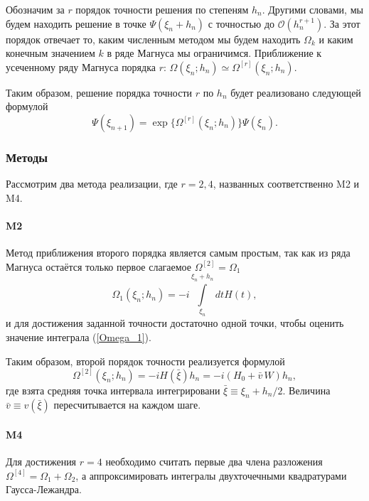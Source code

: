 \documentclass[12pt]{article}
\numberwithin{equation}{section}
\begin{document}
Обозначим за $r$ порядок точности решения по степеням $h_n$. Другими словами, мы будем находить решение в точке $\Psi(\xi_n+h_n)$ с точностью до $\mathcal{O}(h^{r+1}_n)$. За этот порядок отвечает то, каким численным методом мы будем находить $\Omega_k$ и каким конечным значением $k$ в ряде Магнуса мы ограничимся. Приближение к усеченному ряду Магнуса порядка $r$: $\Omega(\xi_n;h_n)\simeq \Omega^{[r]}(\xi_n;h_n)$.

Таким образом, решение порядка точности $r$ по $h_n$ будет реализовано следующей формулой
\begin{equation}
\Psi(\xi_{n+1})=\exp\bigl\{\Omega^{[r]}(\xi_n;h_n)\bigr\}\Psi(\xi_n).
\end{equation}
 
\subsubsection{Методы}

Рассмотрим два метода реализации, где $r=2,4$, названных соответственно M2 и M4.

\paragraph{M2}

Метод приближения второго порядка является самым простым, так как из ряда Магнуса остаётся только первое слагаемое $\Omega^{[2]}=\Omega_1$
\begin{equation}
\label{Omega_1}
\Omega_1(\xi_n;h_n)=-i\!\int\limits_{\xi_n}^{\xi_n+h_n}\! dt H(t),
\end{equation} 
и для достижения заданной точности достаточно одной точки, чтобы оценить значение интеграла (\ref{Omega_1}).

Таким образом, второй порядок точности реализуется формулой
\begin{equation}
\Omega^{[2]}(\xi_n;h_n)=-iH(\bar\xi)h_n=-i(H_0+\bar{v}\,W)h_n,
\end{equation}
где взята средняя точка интервала интегрировани $\bar\xi\equiv\xi_n+h_n/2$. Величина $\bar{v}\equiv v(\bar\xi)$ пересчитывается на каждом шаге.

\paragraph{M4}

Для достижения $r=4$ необходимо считать первые два члена разложения $\Omega^{[4]}=\Omega_1 + \Omega_2$, а аппроксимировать интегралы двухточечными квадратурами Гаусса-Лежандра.
\end{document}
